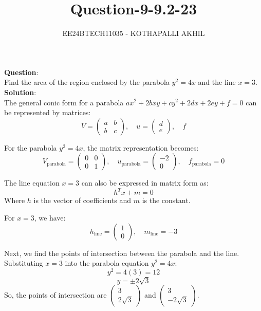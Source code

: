 \documentclass[journal]{IEEEtran}
\begin{document}

\title{Question-9-9.2-23}
\author{EE24BTECH11035 - KOTHAPALLI AKHIL}
{\let\newpage\relax\maketitle}
\vspace{-10mm}
\textbf{Question}:\\
Find the area of the region enclosed by the parabola $y^2 = 4x$ and the line $x = 3$.\\
\textbf{Solution}:\\

The general conic form for a parabola $ax^2 + 2bxy + cy^2 + 2dx + 2ey + f = 0$ can be represented by matrices:
\begin{equation}
V = \begin{pmatrix} a & b \\ b & c \end{pmatrix}, \quad u = \begin{pmatrix} d \\ e \end{pmatrix}, \quad f
\end{equation}

For the parabola $y^2 = 4x$, the matrix representation becomes:
\begin{equation}
V_{\text{parabola}} = \begin{pmatrix} 0 & 0 \\ 0 & 1 \end{pmatrix}, \quad u_{\text{parabola}} = \begin{pmatrix} -2 \\ 0 \end{pmatrix}, \quad f_{\text{parabola}} = 0
\end{equation}

The line equation $x = 3$ can also be expressed in matrix form as:
\begin{equation}
h^T x + m = 0
\end{equation}
Where $h$ is the vector of coefficients and $m$ is the constant.

For $x = 3$, we have:
\begin{equation}
h_{\text{line}} = \begin{pmatrix} 1 \\ 0 \end{pmatrix}, \quad m_{\text{line}} = -3
\end{equation}

Next, we find the points of intersection between the parabola and the line. Substituting $x = 3$ into the parabola equation $y^2 = 4x$:
\begin{equation}
y^2 = 4(3) = 12
\end{equation}
\begin{equation}
y = \pm 2\sqrt{3}
\end{equation}
So, the points of intersection are $\begin{pmatrix} 3 \\ 2\sqrt{3} \end{pmatrix}$ and $\begin{pmatrix} 3 \\ -2\sqrt{3} \end{pmatrix}$.
\end{document}
